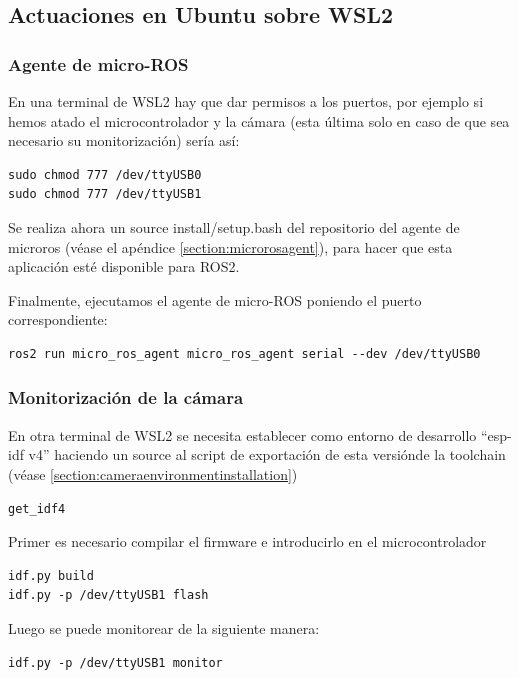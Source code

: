 \subsection{Actuaciones en Ubuntu sobre WSL2}

\subsubsection{Agente de micro-ROS}

En una terminal de WSL2 hay que dar permisos a los puertos, por ejemplo si hemos atado el microcontrolador y la cámara (esta \'ultima solo en caso de que sea necesario su monitorizaci\'on) sería así:

\begin{verbatim}
sudo chmod 777 /dev/ttyUSB0
sudo chmod 777 /dev/ttyUSB1
\end{verbatim}

Se realiza ahora un source install/setup.bash del repositorio del agente de microros (véase el apéndice \ref{section:microrosagent}), para hacer que esta aplicaci\'on est\'e disponible para ROS2.

Finalmente, ejecutamos el agente de micro-ROS poniendo el puerto correspondiente:

\begin{verbatim}
ros2 run micro_ros_agent micro_ros_agent serial --dev /dev/ttyUSB0
\end{verbatim}


\subsubsection{Monitorizaci\'on de la cámara}

En otra terminal de WSL2 se necesita establecer como entorno de desarrollo ``esp-idf v4'' haciendo un source al script de exportaci\'on de esta versi\'onde la toolchain (v\'ease  \ref{section:cameraenvironmentinstallation}) 

\begin{verbatim}
get_idf4
\end{verbatim}

Primer es necesario compilar el firmware e introducirlo en el microcontrolador

\begin{verbatim}
idf.py build
idf.py -p /dev/ttyUSB1 flash
\end{verbatim}

Luego se puede monitorear de la siguiente manera:

\begin{verbatim}
idf.py -p /dev/ttyUSB1 monitor
\end{verbatim}


